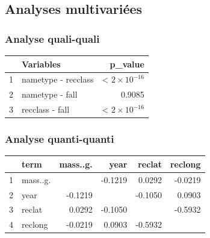 \documentclass[12pt]{article}
\begin{document}
\subsection{Analyses multivariées}
\subsubsection*{Analyse quali-quali}
\begin{table}[H]
\centering
\begin{tabular}{rlr}
  \hline
 & Variables & p\_value \\ 
  \hline
1 & nametype - recclass & < $2\times 10^{-16}$  \\ 
  2 & nametype - fall & 0.9085 \\ 
  3 & recclass - fall & < $2\times 10^{-16}$  \\ 
   \hline
\end{tabular}
\end{table}
\subsubsection*{Analyse quanti-quanti}
\begin{table}[H]
\centering
\begin{tabular}{rlrrrr}
  \hline
 & term & mass..g. & year & reclat & reclong \\ 
  \hline
1 & mass..g. &  & -0.1219 & 0.0292 & -0.0219 \\ 
  2 & year & -0.1219 &  & -0.1050 & 0.0903 \\ 
  3 & reclat & 0.0292 & -0.1050 &  & -0.5932 \\ 
  4 & reclong & -0.0219 & 0.0903 & -0.5932 &  \\ 
   \hline
\end{tabular}
\end{table}
\end{document}
